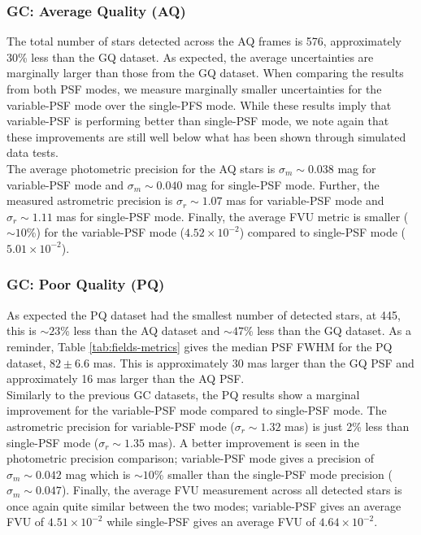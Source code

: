 \documentclass[]{spie}  %
\begin{document}
\subsubsection{GC: Average Quality (AQ)} \label{sec:results-gc-AQ}
The total number of stars detected across the AQ frames is 576, approximately 30\% less than the GQ dataset. As expected, the average uncertainties are marginally larger than those from the GQ dataset. When comparing the results from both PSF modes, we measure marginally smaller uncertainties for the variable-PSF mode over the single-PFS mode. While these results imply that variable-PSF is performing better than single-PSF mode, we note again that these improvements are still well below what has been shown through simulated data tests.
\\
\indent The average photometric precision for the AQ stars is $\sigma_{{m}}{\sim}0.038$ mag for variable-PSF mode and $\sigma_{{m}}{\sim}0.040$ mag for single-PSF mode. Further, the measured astrometric precision is $\sigma_{{r}}{\sim}1.07$ mas for variable-PSF mode and $\sigma_{{r}}{\sim}1.11$ mas for single-PSF mode. Finally, the average FVU metric is smaller (${\sim}10$\%) for the variable-PSF mode ($4.52\times10^{-2}$) compared to single-PSF mode ($5.01\times10^{-2}$).

\subsubsection{GC: Poor Quality (PQ)} \label{sec:results-gc-PQ}
As expected the PQ dataset had the smallest number of detected stars, at 445, this is ${\sim}23$\% less than the AQ dataset and ${\sim}47$\% less than the GQ dataset. As a reminder, Table \ref{tab:fields-metrics} gives the median PSF FWHM for the PQ dataset, $82 \pm 6.6$ mas. This is approximately 30 mas larger than the GQ PSF and approximately 16 mas larger than the AQ PSF.
\\
\indent Similarly to the previous GC datasets, the PQ results show a marginal improvement for the variable-PSF mode compared to single-PSF mode. The astrometric precision for variable-PSF mode ($\sigma_{{r}}{\sim}1.32$ mas) is just 2\% less than single-PSF mode ($\sigma_{{r}}{\sim}1.35$ mas). A better improvement is seen in the photometric precision comparison; variable-PSF mode gives a precision of $\sigma_{{m}}{\sim}0.042$ mag which is ${\sim}10$\% smaller than the single-PSF mode precision ($\sigma_{{m}}{\sim}0.047$). Finally, the average FVU measurement across all detected stars is once again quite similar between the two modes; variable-PSF gives an average FVU of $4.51\times10^{-2}$ while single-PSF gives an average FVU of $4.64\times10^{-2}$.
\end{document}
